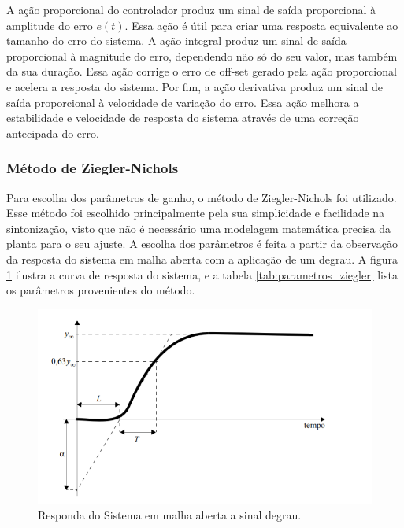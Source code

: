 A ação proporcional do controlador produz um sinal de saída proporcional à amplitude do erro $e(t)$. Essa ação é útil para criar uma resposta equivalente ao tamanho do erro do sistema. A ação integral produz um sinal de saída proporcional à magnitude do erro, dependendo não só do seu valor, mas também da sua duração. Essa ação corrige o erro de off-set gerado pela ação proporcional e acelera a resposta do sistema. Por fim, a ação derivativa produz um sinal de saída proporcional à velocidade de variação do erro. Essa ação melhora a estabilidade e velocidade de resposta do sistema através de uma correção antecipada do erro. 


\subsubsection*{Método de Ziegler-Nichols}


Para escolha dos parâmetros de ganho, o método de Ziegler-Nichols foi utilizado. Esse método foi escolhido principalmente pela sua simplicidade e facilidade na sintonização, visto que não é necessário uma modelagem matemática precisa da planta para o seu ajuste. 
A escolha dos parâmetros é feita a partir da observação da resposta do sistema em malha aberta com a aplicação de um degrau. A figura \ref{fig:resposta_sistema} ilustra a curva de resposta do sistema, e a tabela \ref{tab:parametros_ziegler} lista os parâmetros provenientes do método.


\begin{figure}[h]
    \centering
    \includegraphics[scale=0.45]{figuras/implementacao/hardware/resposta.png}
    \caption{Responda do Sistema em malha aberta a sinal degrau.}
    \label{fig:resposta_sistema}
\end{figure}

